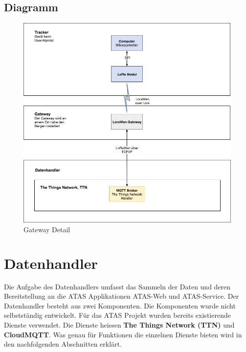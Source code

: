\documentclass[11pt,english,german]{report}
\theoremstyle{definition}
\begin{document}
\subsection{Diagramm}
\begin{figure}[H]
	\centering
	\includegraphics[width=\textwidth]{img/system/ATAS_SystemOverview_Detail_Gateway_BA.jpg}
	\caption[Gateway Detail]
	{Gateway Detail}
\end{figure}

\newpage
\section{Datenhandler}
Die Aufgabe des Datenhandlers umfasst das Sammeln der Daten und deren Bereitstellung an die ATAS Applikationen ATAS-Web und ATAS-Service. Der Datenhandler besteht aus zwei Komponenten. Die Komponenten wurde nicht selbstständig entwickelt. Für das ATAS Projekt wurden bereits existierende Dienste verwendet. Die Dienste heissen \textbf{The Things Network (TTN)} und \textbf{CloudMQTT}. Was genau für Funktionen die einzelnen Dienste bieten wird in den nachfolgenden Abschnitten erklärt.
\end{document}
